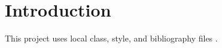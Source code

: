 \section{Introduction}
This project uses local class, style, and bibliography files \cite{lamport1994}.
